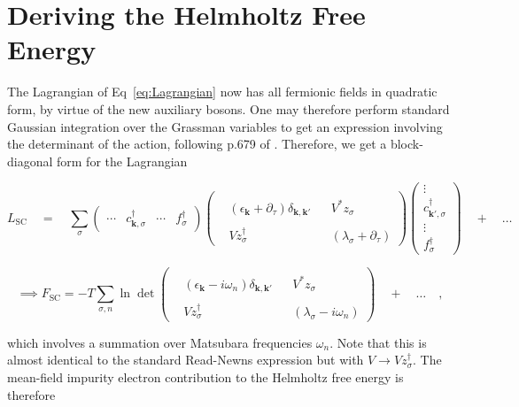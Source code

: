 \section{Deriving the Helmholtz Free Energy}
\label{sec:Free_Energy}

The Lagrangian of Eq~\eqref{eq:Lagrangian} now has all fermionic fields in quadratic form, by virtue of the new auxiliary bosons. One may therefore perform standard Gaussian integration over the Grassman variables to get an expression involving the determinant of the action, following p.679 of \cite{ManyBodyPhysics}. Therefore, we get a block-diagonal form for the Lagrangian


\[
L_{\text{SC}} \quad = \quad \sum_{\sigma}
\begin{pmatrix} \cdots & c^{\dagger}_{\boldsymbol{k},\sigma} & \cdots & f^{\dagger}_{\sigma} \end{pmatrix}
\begin{pmatrix} & & & \\ &(\epsilon_{\boldsymbol{k}} + \partial_{\tau}) \delta_{\boldsymbol{k}, \boldsymbol{k'}} & & V^{\ast} z^{}_{\sigma} \\ & & & \\ & V z^{\dagger}_{\sigma} & & (\lambda_{\sigma} + \partial_{\tau}) \end{pmatrix}
\begin{pmatrix} \vdots \\ c^{\dagger}_{\boldsymbol{k'},\sigma} \\ \vdots \\ f^{\dagger}_{\sigma} \end{pmatrix}
\quad + \quad \hdots
\]

\[
\implies F_{\text{SC}} = - T \sum_{\sigma, n} \ln \det
\begin{pmatrix} & & & \\ &(\epsilon_{\boldsymbol{k}} - i \omega_{n}) \delta_{\boldsymbol{k}, \boldsymbol{k'}} & & V^{\ast} z^{}_{\sigma} \\ & & & \\ & V z^{\dagger}_{\sigma} & & (\lambda_{\sigma} - i \omega_{n}) \end{pmatrix}
\quad + \quad \hdots \quad ,
\]

which involves a summation over Matsubara frequencies $ \omega_{n} $. Note that this is almost identical to the standard Read-Newns expression but with $ V \rightarrow V z^{\dagger}_{\sigma} $. The mean-field impurity electron contribution to the Helmholtz free energy is therefore

